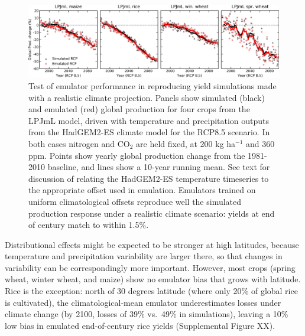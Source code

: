 \documentclass[gmd, manuscript]{copernicus} %
\begin{document}
\begin{figure}[ht]
  \centering
  \includegraphics[width = 16.3cm]{figures/LPJMLRCP85comp.png}
  \caption{
  Test of emulator performance in reproducing yield simulations made with a realistic climate projection. 
  Panels show simulated (black) and emulated (red) global production for four crops from the LPJmL model, driven with temperature and precipitation outputs from the HadGEM2-ES climate model for the RCP8.5 scenario. 
  In both cases nitrogen and CO$_2$ are held fixed, at 200 kg ha$^{-1}$ and 360 ppm.
  Points show yearly global production change from the 1981-2010 baseline, and lines show a 10-year running mean. 
  See text for discussion of relating the HadGEM2-ES temperature timeseries to the appropriate offset used in emulation.
  Emulators trained on uniform climatological offsets reproduce well the simulated production response under a realistic climate scenario: yields at end of century match to within 1.5\%. 
  }
  \label{fig:lpjmlrcp}
\end{figure}

Distributional effects might be expected to be stronger at high latitudes, because temperature and precipitation variability are larger there, so that changes in variability can be correspondingly more important. 
However, most crops (spring wheat, winter wheat, and maize) show no emulator bias that grows with latitude.
Rice is the exception: north of 30 degrees latitude (where only 20\% of global rice is cultivated), the climatological-mean emulator underestimates losses under climate change (by 2100, losses of 39\% vs.\ 49\% in simulations), leaving a 10\% low bias in emulated end-of-century rice yields (Supplemental Figure XX). 
\end{document}

